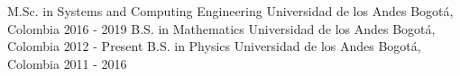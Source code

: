 

\begin{cventries}

\vspace{-1cm}
\cventry{}{}{}{}{}
\noindent
\cventry
{M.Sc. in Systems and Computing Engineering} %
{Universidad de los Andes} %
{Bogotá, Colombia} %
{2016 - 2019} %
{}
\cventry
{B.S. in Mathematics} %
{Universidad de los Andes} %
{Bogotá, Colombia} %
{2012 - Present} %
{}
\cventry
{B.S. in Physics} %
{Universidad de los Andes} %
{Bogotá, Colombia} %
{2011 - 2016} %
{}

\vspace{-0.5cm}
\end{cventries}
